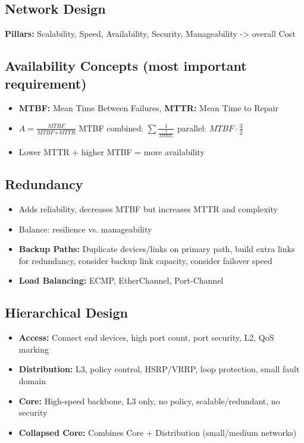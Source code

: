 \begin{multicols*}{5}
		\section{Network Design}
		\textbf{Pillars:} Scalability, Speed, Availability, Security, Manageability -> overall Cost
		\subsection{Availability Concepts (most important requirement)}
		\begin{itemize}
			\item \textbf{MTBF:} Mean Time Between Failures, \textbf{MTTR:} Mean Time to Repair
			\item $A=\frac{\textit{MTBF}}{\textit{MTBF} + \textit{MTTR}}$ MTBF combined: $\sum \frac{1}{\frac{1}{\textit{MTBF}_n}}$ parallel: $\textit{MTBF} \cdot \frac{3}{2}$
			\item Lower MTTR + higher MTBF = more availability
		\end{itemize}
		
		\subsection{Redundancy}
		\begin{itemize}
			\item Adds reliability, decreases MTBF but increases MTTR and complexity
			\item Balance: resilience vs. manageability
			\item \textbf{Backup Paths:} Duplicate devices/links on primary path, build extra links for redundancy, consider backup link capacity, consider failover speed
			\item \textbf{Load Balancing:} ECMP, EtherChannel, Port-Channel
		\end{itemize}
		
		\subsection{Hierarchical Design}
		\begin{itemize}
			\item \textbf{Access:} Connect end devices, high port count, port security, L2, QoS marking
			\item \textbf{Distribution:} L3, policy control, HSRP/VRRP, loop protection, small fault domain
			\item \textbf{Core:} High-speed backbone, L3 only, no policy, scalable/redundant, no security
			\item \textbf{Collapsed Core:} Combines Core + Distribution (small/medium networks)
		\end{itemize}
		

\end{multicols*}
